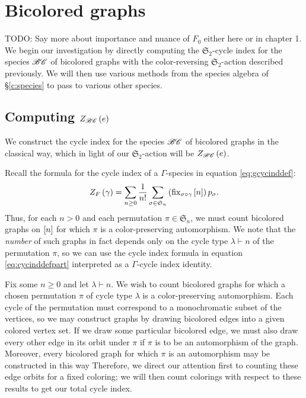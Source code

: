 \documentclass[sectionflow,singlespace,twoside,boldmathhdr]{brandiss} %
\numberwithin{section}{chapter}
\numberwithin{figure}{chapter}
\begin{document}
\section{Bicolored graphs}\label{s:bcgraph}
TODO: Say more about importance and nuance of $F_{0}$ either here or in chapter 1.
We begin our investigation by directly computing the $\mathfrak{S}_{2}$-cycle index for the species $\mathscr{BC}$ of bicolored graphs with the color-reversing $\mathfrak{S}_{2}$-action described previously.
We will then use various methods from the species algebra of \S \ref{c:species} to pass to various other species.

\subsection{Computing $Z_{\mathscr{BC}} \left( {e} \right)$}\label{ss:ecibc}
We construct the cycle index for the species $\mathscr{BC}$ of bicolored graphs in the classical way, which in light of our $\mathfrak{S}_{2}$-action will be $Z_{\mathscr{BC}} \left( {e} \right)$. 

Recall the formula for the cycle index of a $\Gamma$-species in equation \eqref{eq:gcycinddef}:
\begin{equation*}
  Z_{F} \left( {\gamma} \right) = \sum_{n \geq 0} \frac{1}{n!} \sum_{\sigma \in \mathfrak{S}_{n}} \left( {\operatorname{fix}_{\sigma \circ \gamma} \left[ {n} \right]} \right) p_{\sigma}.
\end{equation*}
Thus, for each $n > 0$ and each permutation $\pi \in \mathfrak{S}_{n}$, we must count bicolored graphs on $\left[ {n} \right]$ for which $\pi$ is a color-preserving automorphism.
We note that the \emph{number} of such graphs in fact depends only on the cycle type $\lambda \vdash n$ of the permutation $\pi$, so we can use the cycle index formula in equation \eqref{eq:cycinddefpart} interpreted as a $\Gamma$-cycle index identity.

Fix some $n \geq 0$ and let $\lambda \vdash n$.
We wish to count bicolored graphs for which a chosen permutation $\pi$ of cycle type $\lambda$ is a color-preserving automorphism.
Each cycle of the permutation must correspond to a monochromatic subset of the vertices, so we may construct graphs by drawing bicolored edges into a given colored vertex set.
If we draw some particular bicolored edge, we must also draw every other edge in its orbit under $\pi$ if $\pi$ is to be an automorphism of the graph.
Moreover, every bicolored graph for which $\pi$ is an automorphism may be constructed in this way
Therefore, we direct our attention first to counting these edge orbits for a fixed coloring; we will then count colorings with respect to these results to get our total cycle index.
\end{document}
